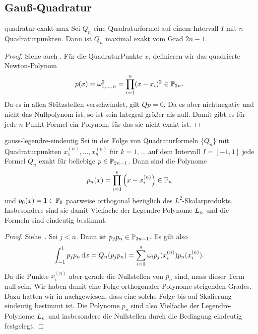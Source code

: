 \subsection{Gauß-Quadratur}

\begin{Lemma}{quadratur-exakt-max}
  Sei $Q_n$ eine Quadraturformel auf einem Intervall $I$ mit $n$
  Quadraturpunkten. Dann ist $Q_n$ maximal exakt vom Grad $2n-1$.
\end{Lemma}

\begin{proof}
  Siehe auch \cite[Satz 3.1]{Rannacher17}.  Für die QuadraturPunkte $x_i$
  definieren wir das quadrierte Newton-Polynom
  \begin{gather}
    p(x) = \omega_{1,\dots,n}^2 = \prod_{i=1}^n (x-x_i)^2 \in \P_{2n}.
  \end{gather}
  Da es in allen Stützstellen verschwindet, gilt $Q{p} = 0$. Da es
  aber nichtnegativ und nicht das Nullpolynom ist, so ist sein
  Integral größer als null. Damit gibt es für jede $n$-Punkt-Formel
  ein Polynom, für das sie nicht exakt ist.
\end{proof}

\begin{Satz}{gauss-legendre-eindeutig}
  Sei in der Folge von Quadraturformeln $\{Q_n\}$ mit Quadraturpunkten
  $x_1^{(n)},\dots,x_n^{(n)}$ für $k=1,\dots$ auf dem Intervall
  $I=[-1,1]$ jede Formel $Q_n$ exakt für beliebige $p\in
  \P_{2n-1}$. Dann sind die Polynome
  \begin{gather}
    p_n(x) = \prod_{i=1}^n \left(x-x_i^{(n)}\right) \in \P_n
  \end{gather}
  und $p_0(x) = 1 \in \P_0$ paarweise orthogonal bezüglich des
  $L^2$-Skalarprodukts. Insbesondere sind sie damit Vielfache der
  Legendre-Polynome $\plegendre_n$ und die Formeln sind eindeutig
  bestimmt.
\end{Satz}

\begin{proof}
  Siehe~\cite[Lemma 9.9 und 9.10]{DeuflhardHohmann08}.
  Sei $j<n$. Dann ist $p_jp_n\in \P_{2n-1}$. Es gilt also
  \begin{gather}
    \int_{-1}^1 p_jp_n \dx = Q_n(p_jp_n)
    = \sum_{i=0}^n \omega_i p_j(x_i^{(n)}) p_n(x_i^{(n)}).
  \end{gather}
  Da die Punkte $x_i^{(n)}$ aber gerade die Nullstellen von $p_n$
  sind, muss dieser Term null sein. Wir haben damit eine Folge
  orthogonaler Polynome steigenden Grades. Dazu hatten wir in
   nachgewiesen, dass eine solche Folge bis
  auf Skalierung eindeutig bestimmt ist. Die Polynome $p_n$ sind also
  Vielfache der Legendre-Polynome $\plegendre_n$ und insbesondere die
  Nullstellen durch die Bedingung eindeutig festgelegt.
\end{proof}

